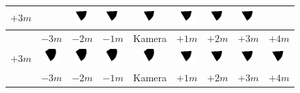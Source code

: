 \begin{tabular}{|c|c|c|c|c|c|c|c|c|}
	\hline 
	$+3m$ & &
	\includegraphics[width=0.5cm]{img_Bereich/V2_img_Winkel_Y_-2000_3000.png}&
	\includegraphics[width=0.5cm]{img_Bereich/V2_img_Winkel_Y_-1000_3000.png}&
	\includegraphics[width=0.5cm]{img_Bereich/V2_img_Winkel_Y_0_3000.png}&
	\includegraphics[width=0.5cm]{img_Bereich/V2_img_Winkel_Y_1000_3000.png}&
	\includegraphics[width=0.5cm]{img_Bereich/V2_img_Winkel_Y_2000_3000.png}&
	\includegraphics[width=0.5cm]{img_Bereich/V2_img_Winkel_Y_3000_3000.png}&\\ 
	\hline 
	& $-3m$ & $-2m$ & $-1m$ &Kamera& $+1m$ & $+2m$ & $+3m$ & $+4m$ \\ 
	\hline
	\hline 
	$+3m$ &
	\includegraphics[width=0.5cm]{img_Bereich/V2_vid_Winkel_Y_-3000_3000.png}&
	\includegraphics[width=0.5cm]{img_Bereich/V2_vid_Winkel_Y_-2000_3000.png}&
	\includegraphics[width=0.5cm]{img_Bereich/V2_vid_Winkel_Y_-1000_3000.png}&
	\includegraphics[width=0.5cm]{img_Bereich/V2_vid_Winkel_Y_0_3000.png}&
	\includegraphics[width=0.5cm]{img_Bereich/V2_vid_Winkel_Y_1000_3000.png}&
	\includegraphics[width=0.5cm]{img_Bereich/V2_vid_Winkel_Y_2000_3000.png}&
	\includegraphics[width=0.5cm]{img_Bereich/V2_vid_Winkel_Y_3000_3000.png}&
	\includegraphics[width=0.5cm]{img_Bereich/V2_vid_Winkel_Y_4000_3000.png}\\ 
	\hline 
	& $-3m$ & $-2m$ & $-1m$ &Kamera& $+1m$ & $+2m$ & $+3m$ & $+4m$ \\ 
	\hline 
\end{tabular}